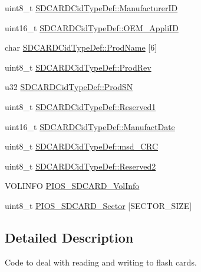 \begin{DoxyCompactItemize}
\item 
uint8\-\_\-t \hyperlink{group___p_i_o_s___s_d_c_a_r_d_ga083dff8fb19fcec5bf79ab18c105b6c3}{\-S\-D\-C\-A\-R\-D\-Cid\-Type\-Def\-::\-Manufacturer\-I\-D}
\item 
uint16\-\_\-t \hyperlink{group___p_i_o_s___s_d_c_a_r_d_gaba70fef7b702c2d5dc086c3cc997d4bc}{\-S\-D\-C\-A\-R\-D\-Cid\-Type\-Def\-::\-O\-E\-M\-\_\-\-Appli\-I\-D}
\item 
char \hyperlink{group___p_i_o_s___s_d_c_a_r_d_gad17afffd675a78059aa60101165d709d}{\-S\-D\-C\-A\-R\-D\-Cid\-Type\-Def\-::\-Prod\-Name} \mbox{[}6\mbox{]}
\item 
uint8\-\_\-t \hyperlink{group___p_i_o_s___s_d_c_a_r_d_ga8307b63b043ed01d0fa11493c9508dac}{\-S\-D\-C\-A\-R\-D\-Cid\-Type\-Def\-::\-Prod\-Rev}
\item 
u32 \hyperlink{group___p_i_o_s___s_d_c_a_r_d_ga243ea864815caa90de7e151c8d8a7195}{\-S\-D\-C\-A\-R\-D\-Cid\-Type\-Def\-::\-Prod\-S\-N}
\item 
uint8\-\_\-t \hyperlink{group___p_i_o_s___s_d_c_a_r_d_gaa6d5ceee00ac588d04a7d1e913746732}{\-S\-D\-C\-A\-R\-D\-Cid\-Type\-Def\-::\-Reserved1}
\item 
uint16\-\_\-t \hyperlink{group___p_i_o_s___s_d_c_a_r_d_gae7c9d488577977c2c5c2baca30ca6cec}{\-S\-D\-C\-A\-R\-D\-Cid\-Type\-Def\-::\-Manufact\-Date}
\item 
uint8\-\_\-t \hyperlink{group___p_i_o_s___s_d_c_a_r_d_gaeafc9f7dae979dcf639b88246bbe29b6}{\-S\-D\-C\-A\-R\-D\-Cid\-Type\-Def\-::msd\-\_\-\-C\-R\-C}
\item 
uint8\-\_\-t \hyperlink{group___p_i_o_s___s_d_c_a_r_d_gab50b795387215c00e5d9b5feb7e9aefb}{\-S\-D\-C\-A\-R\-D\-Cid\-Type\-Def\-::\-Reserved2}
\item 
\-V\-O\-L\-I\-N\-F\-O \hyperlink{group___p_i_o_s___s_d_c_a_r_d_gaeb82765ef4d7741f373422b30dba4f32}{\-P\-I\-O\-S\-\_\-\-S\-D\-C\-A\-R\-D\-\_\-\-Vol\-Info}
\item 
uint8\-\_\-t \hyperlink{group___p_i_o_s___s_d_c_a_r_d_ga51dd7d1ab7b2ae3878345834e20546a6}{\-P\-I\-O\-S\-\_\-\-S\-D\-C\-A\-R\-D\-\_\-\-Sector} \mbox{[}\-S\-E\-C\-T\-O\-R\-\_\-\-S\-I\-Z\-E\mbox{]}
\end{DoxyCompactItemize}


\subsection{\-Detailed \-Description}
\-Code to deal with reading and writing to flash cards. 


